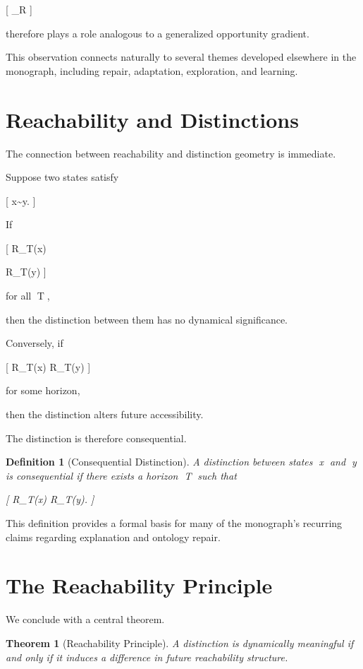 \documentclass[11pt,oneside,openany]{book}
\newtheorem{definition}{Definition}[chapter] \newtheorem{theorem}{Theorem}[chapter] \newtheorem{proposition}{Proposition}[chapter] \newtheorem{lemma}{Lemma}[chapter] \newtheorem{corollary}{Corollary}[chapter] \newtheorem{remark}{Remark}[chapter]
\begin{document}
[
\nabla\Phi_R
]

therefore plays a role analogous to a generalized opportunity gradient.

This observation connects naturally to several themes developed elsewhere in the monograph, including repair, adaptation, exploration, and learning.

\section{Reachability and Distinctions}

The connection between reachability and distinction geometry is immediate.

Suppose two states satisfy

[
x\sim y.
]

If

[
R_T(x)

R_T(y)
]

for all T,

then the distinction between them has no dynamical significance.

Conversely, if

[
R_T(x)
\neq
R_T(y)
]

for some horizon,

then the distinction alters future accessibility.

The distinction is therefore consequential.

\begin{definition}[Consequential Distinction]

A distinction between states x and y is consequential if there exists a horizon T such that

[
R_T(x)
\neq
R_T(y).
]

\end{definition}

This definition provides a formal basis for many of the monograph's recurring claims regarding explanation and ontology repair.

\section{The Reachability Principle}

We conclude with a central theorem.

\begin{theorem}[Reachability Principle]

A distinction is dynamically meaningful if and only if it induces a difference in future reachability structure.

\end{theorem}
\end{document}
